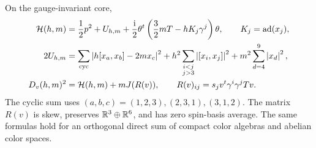 \begin{proposition}
\label{prop:square}
On the gauge-invariant core,
\begin{equation}
\label{eq:square}
\begin{aligned}
 \mathcal H(h,m)&=\frac12p^2+U_{h,m}
   +\frac{\mathrm i}{2}\theta^t\left(\frac32mT-hK_j\gamma^j\right)\theta,
       \qquad K_j=\operatorname{ad}(x_j),\\
 2U_{h,m}&=\sum_{\mathrm{cyc}}
       \left\lvert h[x_a,x_b]-2mx_c\right\rvert^2
       +h^2\sum_{\substack{i<j\\j>3}}\left\lvert [x_i,x_j]\right\rvert^2
       +m^2\sum_{d=4}^9\left\lvert x_d\right\rvert^2,\\
 D_v(h,m)^2&=\mathcal H(h,m)+mJ(R(v)),
       \qquad R(v)_{ij}=s_jv^t\gamma^i\gamma^jTv.
\end{aligned}
\end{equation}
The cyclic sum uses \((a,b,c)=(1,2,3),(2,3,1),(3,1,2)\).
The matrix \(R(v)\) is skew, preserves \(\mathbb R^3\oplus\mathbb R^6\), and has
zero spin-basis average. The same formulas hold for an orthogonal
direct sum of compact color algebras and abelian color spaces.
\end{proposition}

